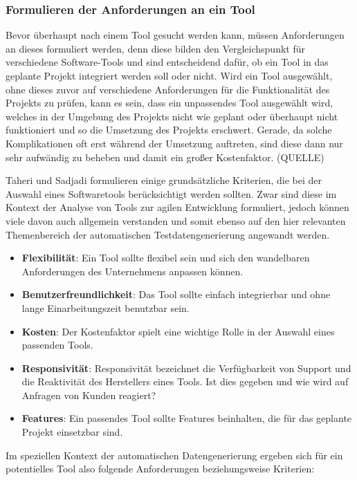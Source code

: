\subsubsection*{Formulieren der Anforderungen an ein Tool}\label{toolanalyseanforderungen}
Bevor überhaupt nach einem Tool gesucht werden kann, müssen Anforderungen an dieses formuliert werden, denn diese bilden den Vergleichspunkt für verschiedene Software-Tools und sind entscheidend dafür, ob ein Tool in das geplante Projekt integriert werden soll oder nicht. Wird ein Tool ausgewählt, ohne dieses zuvor auf verschiedene Anforderungen für die Funktionalität des Projekts zu prüfen, kann es sein, dass ein unpassendes Tool ausgewählt wird, welches in der Umgebung des Projekts nicht wie geplant oder überhaupt nicht funktioniert und so die Umsetzung des Projekts erschwert. \cite[S. 249]{fewster:1999} Gerade, da solche Komplikationen oft erst während der Umsetzung auftreten, sind diese dann nur sehr aufwändig zu beheben und damit ein großer Kostenfaktor. (QUELLE) 

Taheri und Sadjadi formulieren einige grundsätzliche Kriterien, die bei der Auswahl eines Softwaretools berücksichtigt werden sollten. Zwar sind diese im Kontext der Analyse von Tools zur agilen Entwicklung formuliert, jedoch können viele davon auch allgemein verstanden und somit ebenso auf den hier relevanten Themenbereich der automatischen Testdatengenerierung angewandt werden.

\begin{itemize}
    \item \textbf{Flexibilität}: Ein Tool sollte flexibel sein und sich den wandelbaren Anforderungen des Unternehmens anpassen können.
    \item \textbf{Benutzerfreundlichkeit}: Das Tool sollte einfach integrierbar und ohne lange Einarbeitungszeit benutzbar sein.
    \item \textbf{Kosten}: Der Kostenfaktor spielt eine wichtige Rolle in der Auswahl eines passenden Tools.
    \item \textbf{Responsivität}: Responsivität bezeichnet die Verfügbarkeit von Support und die Reaktivität des Herstellers eines Tools. Ist dies gegeben und wie wird auf Anfragen von Kunden reagiert?
    \item \textbf{Features}: Ein passendes Tool sollte Features beinhalten, die für das geplante Projekt einsetzbar sind.
\end{itemize}
\cite{taheri:2015}

Im speziellen Kontext der automatischen Datengenerierung ergeben sich für ein potentielles Tool also folgende Anforderungen beziehungsweise Kriterien:

